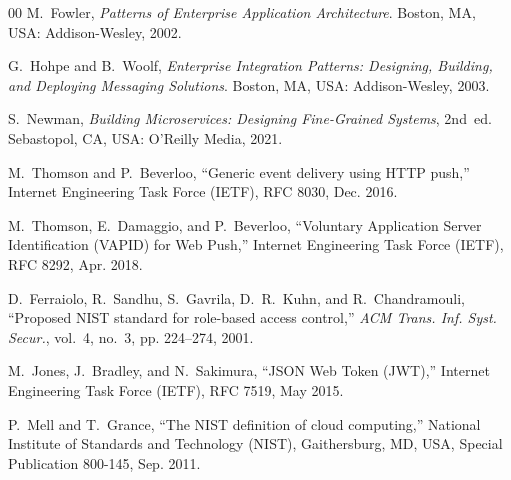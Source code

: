 \documentclass[conference]{IEEEtran}
\begin{document}
\begin{thebibliography}{00}
M.~Fowler, \emph{Patterns of Enterprise Application Architecture}. Boston, MA, USA: Addison-Wesley, 2002.

G.~Hohpe and B.~Woolf, \emph{Enterprise Integration Patterns: Designing, Building, and Deploying Messaging Solutions}. Boston, MA, USA: Addison-Wesley, 2003.

S.~Newman, \emph{Building Microservices: Designing Fine-Grained Systems}, 2nd~ed. Sebastopol, CA, USA: O'Reilly Media, 2021.

M.~Thomson and P.~Beverloo, ``Generic event delivery using HTTP push,'' Internet Engineering Task Force (IETF), RFC 8030, Dec. 2016.

M.~Thomson, E.~Damaggio, and P.~Beverloo, ``Voluntary Application Server Identification (VAPID) for Web Push,'' Internet Engineering Task Force (IETF), RFC 8292, Apr. 2018.

D.~Ferraiolo, R.~Sandhu, S.~Gavrila, D.~R.~Kuhn, and R.~Chandramouli, ``Proposed NIST standard for role-based access control,'' \emph{ACM Trans. Inf. Syst. Secur.}, vol.~4, no.~3, pp. 224--274, 2001.

M.~Jones, J.~Bradley, and N.~Sakimura, ``JSON Web Token (JWT),'' Internet Engineering Task Force (IETF), RFC 7519, May 2015.

P.~Mell and T.~Grance, ``The NIST definition of cloud computing,'' National Institute of Standards and Technology (NIST), Gaithersburg, MD, USA, Special Publication 800-145, Sep. 2011.

\end{thebibliography}
\end{document}
